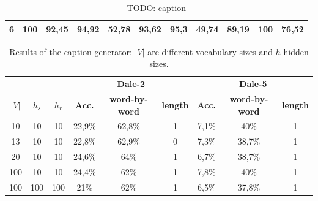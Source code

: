 \begin{table}[ht]
\begin{tabular}{cc|ccc|ccc|ccc}
        {6}                           & {100}   & {92,45}                             & {94,92}                             & {52,78}                                   & {93,62}                         & {95,3}                          & {49,74}                        & {89,19}                         & {100}                           & {76,52}                        \\
        \bottomrule
    \end{tabular}
    \caption{TODO: caption}
    \label{TODO: label}
\end{table}



\begin{table}[ht]
    \centering
    \begin{tabular}{ccc|ccc|ccc}
        \toprule
              &         &         & \multicolumn{3}{c}{\textbf{Dale-2}} & \multicolumn{3}{c}{\textbf{Dale-5}}                                                                             \\\cmidrule(lr){4-6}\cmidrule(lr){7-9}
        $|V|$ & $h_{s}$ & $h_{r}$ & \textbf{Acc.}                       & \textbf{word-by-word}               & \textbf{length} & \textbf{Acc.} & \textbf{word-by-word} & \textbf{length} \\\midrule
        {10}  & {10}    & {10}    & {22,9\%}                            & {62,8\%}                            & {1}             & {7,1\%}       & {40\%}                & {1}             \\
        {13}  & {10}    & {10}    & {22,8\%}                            & {62,9\%}                            & {0}             & {7,3\%}       & {38,7\%}              & {1}             \\
        {20}  & {10}    & {10}    & {24,6\%}                            & {64\%}                              & {1}             & {6,7\%}       & {38,7\%}              & {1}             \\
        {100} & {10}    & {10}    & {24,4\%}                            & {62\%}                              & {1}             & {7,8\%}       & {40\%}                & {1}             \\
        {100} & {100}   & {100}   & {21\%}                              & {62\%}                              & {1}             & {6,5\%}       & {37,8\%}              & {1}             \\
        \bottomrule
    \end{tabular}
    \caption{Results of the caption generator: $|V|$ are different vocabulary sizes and $h$ hidden sizes.}
    \label{tab:results_caption_generator_game}
\end{table}

